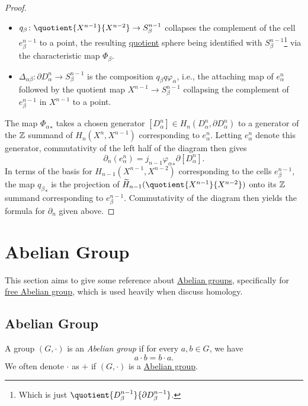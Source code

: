\begin{proof}
\begin{itemize}
		\item \(q_\beta \colon \quotient{X^{n-1} }{X^{n-2} } \to S^{n-1}_\beta\) collapses the complement of the cell \(e^{n-1}_\beta\) to a point, the resulting
		      \hyperref[CW-complex-quotient]{quotient} sphere being identified with \(S^{n-1}_\beta\)\footnote{Which is just \(\quotient{D^{n-1}_\beta}{\partial D^{n-1}_\beta}\).}
		      via the characteristic map \(\Phi _\beta \).
		\item \(\Delta _{\alpha \beta }\colon \partial D^n_\alpha \to S^{n-1}_\beta\) is the composition \(q_\beta q \varphi _\alpha \), i.e., the
		      attaching map of \(e^n_\alpha \) followed by the quotient map \(X^{n-1}\to S^{n-1}_\beta\) collapsing the complement of \(e^{n-1}_\beta\)
		      in \(X^{n-1}\) to a point.
	\end{itemize}

	The map \({\Phi _\alpha }_\ast\) takes a chosen generator \([D^n_\alpha ]\in H_n(D^n_\alpha , \partial D^n_\alpha )\) to a generator of the \(\mathbb{\MakeUppercase{z}} \)
	summand of \(H_n(X^n, X^{n-1})\) corresponding to \(e^n_\alpha \). Letting \(e^n_\alpha \) denote this generator, commutativity of the left half
	of the diagram then gives
	\[
		\partial _n(e^n_\alpha )= j_{n-1}{\varphi _\alpha }_\ast\partial [D^n_\alpha ].
	\]
	In terms of the basis for \(H_{n-1}(X^{n-1}, X^{n-2} )\) corresponding to the cells \(e^{n-1}_\beta\), the map \({q_\beta }_\ast\) is the projection of
	\(\widetilde{H} _{n-1}(\quotient{X^{n-1} }{X^{n-2}})\) onto its \(\mathbb{\MakeUppercase{z}} \) summand corresponding to \(e^{n-1}_\beta\).
	Commutativity of the diagram then yields the formula for \(\partial _n\) given above.
\end{proof}

\chapter{Abelian Group}
This section aims to give some reference about \hyperref[def:Abelian-group]{Abelian groups}, specifically for \hyperref[def:free-Abelian-group]{free Abelian group}, which is used
heavily when discuss homology.
\section{Abelian Group}
\begin{definition}\label{def:Abelian-group}
	A group \((G, \cdot)\) is an \emph{Abelian group} if for every \(a, b\in G\), we have
	\[
		a\cdot b = b\cdot a.
	\]
	We often denote \(\cdot\) as \(+\) if \((G, \cdot)\) is a \hyperref[def:Abelian-group]{Abelian group}.
\end{definition}

